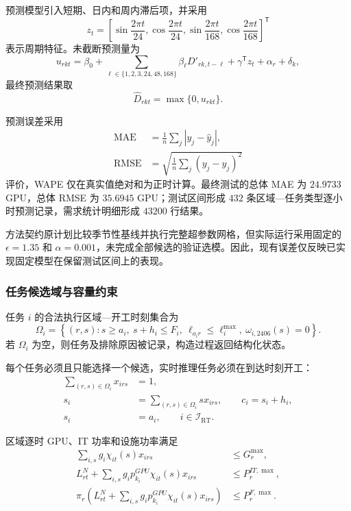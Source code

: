 \documentclass[withoutpreface,bwprint]{cumcmthesis}
\begin{document}
预测模型引入短期、日内和周内滞后项，并采用
\begin{equation}
z_t=\left[
\sin\frac{2\pi t}{24},
\cos\frac{2\pi t}{24},
\sin\frac{2\pi t}{168},
\cos\frac{2\pi t}{168}
\right]^{\mathsf T}
\end{equation}
表示周期特征。未截断预测量为
\begin{equation}
u_{rkt}=\beta_0+
\sum_{\ell\in\{1,2,3,24,48,168\}}\beta_\ell D'_{rk,t-\ell}
+\gamma^{\mathsf T}z_t+\alpha_r+\delta_k,
\end{equation}
最终预测结果取
\begin{equation}
\widehat D_{rkt}=\max\{0,u_{rkt}\}.
\end{equation}

预测误差采用
\begin{align}
\mathrm{MAE}&=\frac{1}{n}\sum_j|y_j-\widehat y_j|,\\
\mathrm{RMSE}&=\sqrt{\frac{1}{n}\sum_j(y_j-\widehat y_j)^2}
\end{align}
评价，WAPE 仅在真实值绝对和为正时计算。最终测试的总体 MAE 为 $24.9733$ GPU，总体 RMSE 为 $35.6945$ GPU；测试区间形成 $432$ 条区域—任务类型逐小时预测记录，需求统计明细形成 $43200$ 行结果。

方法契约原计划比较季节性基线并执行完整超参数网格，但实际运行采用固定的 $\epsilon=1.35$ 和 $\alpha=0.001$，未完成全部候选的验证选模。因此，现有误差仅反映已实现固定模型在保留测试区间上的表现。

\subsubsection{任务候选域与容量约束}

任务 $i$ 的合法执行区域—开工时刻集合为
\begin{equation}
\Omega_i=\left\{(r,s):s\ge a_i,\ s+h_i\le F_i,\
\ell_{o_ir}\le\ell_i^{\max},\ \omega_{i,2406}(s)=0\right\}.
\end{equation}
若 $\Omega_i$ 为空，则任务及排除原因被记录，构造过程返回结构化状态。

每个任务必须且只能选择一个候选，实时推理任务必须在到达时刻开工：
\begin{align}
\sum_{(r,s)\in\Omega_i}x_{irs}&=1,\\
s_i&=\sum_{(r,s)\in\Omega_i}sx_{irs},\qquad c_i=s_i+h_i,\\
s_i&=a_i,\qquad i\in\mathcal I_{\mathrm{RT}}.
\end{align}

区域逐时 GPU、IT 功率和设施功率满足
\begin{align}
\sum_{i,s}g_i\chi_{it}(s)x_{irs}&\le G_r^{\max},\\
L_{rt}^{N}+\sum_{i,s}g_ip_{k_i}^{GPU}\chi_{it}(s)x_{irs}
&\le P_r^{IT,\max},\\
\pi_r\left(L_{rt}^{N}+\sum_{i,s}g_ip_{k_i}^{GPU}
\chi_{it}(s)x_{irs}\right)&\le P_r^{F,\max}.
\end{align}
\end{document}
